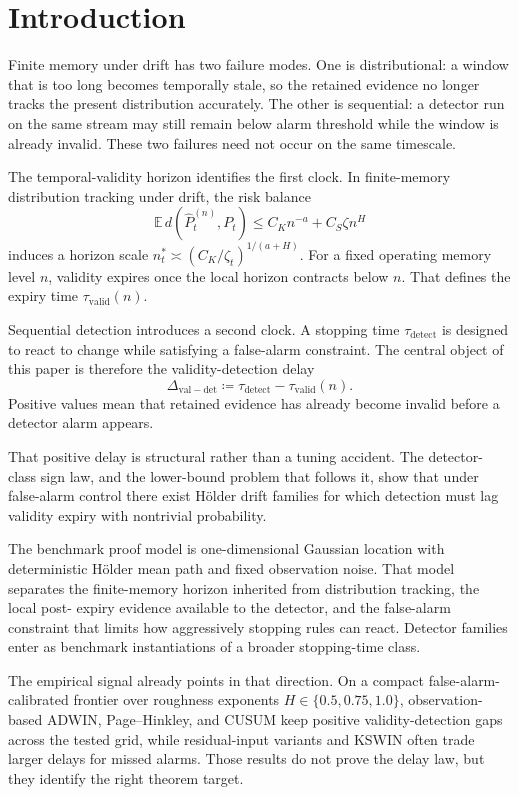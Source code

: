 \section{Introduction}

Finite memory under drift has two failure modes. One is distributional: a
window that is too long becomes temporally stale, so the retained evidence no
longer tracks the present distribution accurately. The other is sequential: a
detector run on the same stream may still remain below alarm threshold while the
window is already invalid. These two failures need not occur on the same
timescale.

The temporal-validity horizon identifies the first clock. In finite-memory
distribution tracking under drift, the risk balance
\[
  \mathbb E\,d(\widehat P_t^{(n)},P_t) \le C_K n^{-a} + C_S \zeta n^H
\]
induces a horizon scale $n_t^* \asymp (C_K/\zeta_t)^{1/(a+H)}$. For a fixed
operating memory level $n$, validity expires once the local horizon contracts
below $n$. That defines the expiry time $\tau_{\mathrm{valid}}(n)$.

Sequential detection introduces a second clock. A stopping time
$\tau_{\mathrm{detect}}$ is designed to react to change while satisfying a
false-alarm constraint. The central object of this paper is therefore the
validity-detection delay
\[
  \Delta_{\mathrm{val-det}} \coloneqq \tau_{\mathrm{detect}} - \tau_{\mathrm{valid}}(n).
\]
Positive values mean that retained evidence has already become invalid before a
detector alarm appears.

That positive delay is structural rather than a tuning accident. The detector-
class sign law, and the lower-bound problem that follows it, show that under
false-alarm control there exist H\"older drift families for which detection must
lag validity expiry with nontrivial probability.

The benchmark proof model is one-dimensional Gaussian location with deterministic
H\"older mean path and fixed observation noise. That model separates the
finite-memory horizon inherited from distribution tracking, the local post-
expiry evidence available to the detector, and the false-alarm constraint that
limits how aggressively stopping rules can react. Detector families enter as
benchmark instantiations of a broader stopping-time class.

The empirical signal already points in that direction. On a compact
false-alarm-calibrated frontier over roughness exponents
$H\in\{0.5,0.75,1.0\}$, observation-based ADWIN, Page--Hinkley, and CUSUM keep
positive validity-detection gaps across the tested grid, while residual-input
variants and KSWIN often trade larger delays for missed alarms. Those results do
not prove the delay law, but they identify the right theorem target.

